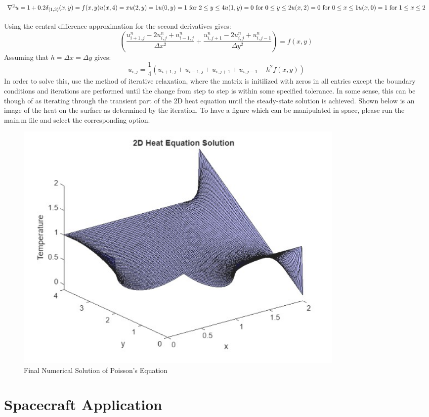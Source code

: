 \documentclass{article}
\begin{document}
\subsection*{$\nabla^2u = 1 + 0.2\delta_{(1,3)}(x,y) = f(x,y)\\u(x,4) = x\\u(2,y) = 1\\u(0,y) = 1 \text{ for } 2 \leq y \leq 4\\u(1,y) = 0 \text{ for } 0 \leq y \leq 2\\u(x,2) = 0 \text{ for } 0 \leq x \leq 1\\u(x,0) = 1 \text{ for } 1 \leq x \leq 2$}
Using the central difference approximation for the second derivatives gives:
\begin{equation}
    \left(\frac{u_{i+1,j}^n - 2u_{i,j}^n + u_{i-1,j}^n}{\Delta x^2} + \frac{u_{i,j+1}^n - 2u_{i,j}^n + u_{i,j-1}^n}{\Delta y^2}\right) = f(x,y)
\end{equation}
Assuming that $h=\Delta x=\Delta y$ gives:
\begin{equation}
    u_{i,j} = \frac{1}{4}\left(u_{i+1,j} + u_{i-1,j} + u_{i,j+1} + u_{i,j-1} - h^2f(x,y)\right)
\end{equation}
In order to solve this, use the method of iterative relaxation, where the matrix is initilized with zeros in all entries except the boundary conditions and iterations are performed until the change from step to step is within some specified tolerance. In some sense, this can be though of as iterating through the transient part of the 2D heat equation until the steady-state solution is achieved. Shown below is an image of the heat on the surface as determined by the iteration. To have a figure which can be manipulated in space, please run the main.m file and select the corresponding option.
\begin{figure}[H]
    \centering
    \includegraphics[width=0.8\textwidth]{poisson_example.jpg}
    \caption{Final Numerical Solution of Poisson's Equation}
\end{figure}

\section{Spacecraft Application}






\end{document}
